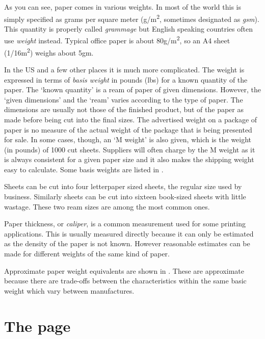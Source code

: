 \documentclass[10pt,letterpaper,extrafontsizes]{memoir}
\newcommand*{\sqrd}[1]{#1\textsuperscript{2}}
\newcommand*{\gsm}{g/\sqrd{m}}
\newcommand*{\half}{\slashfrac{1}{2}}
\begin{document}
    As you can see, paper comes in various weights. In most of the world this
is simply specified as grams per square meter (\gsm, sometimes designated as
\emph{gsm}). This quantity is properly called \emph{grammage}
but English
speaking countries often use \emph{weight} instead. Typical office
paper is about 80\gsm, so an A4 sheet (1/16\sqrd{m}) weighs about 5gm.

    In the US and a few other places it is much more complicated. The
weight is expressed in terms of \emph{basis weight} 
in pounds (lbs) for a known quantity of the
paper. The `known quantity' is a ream of paper of given dimensions. However, 
the `given dimensions' and the `ream' varies according to the type of paper.
The dimensions are usually not those of the finished product, but of the paper
as made before being cut into the final sizes. 
The advertised weight on a package of paper is no measure of the actual 
weight of the package that is being presented for sale. 
In some cases, though, an `M weight' is also given, 
which is the weight (in
pounds) of 1000 cut sheets. Suppliers will often charge by the M weight as it
is always consistent for a given paper size and it also makes the shipping
weight easy to calculate. Some basis weights
are listed in .


    
    Sheets  can be cut into four \abybm{8\,\half}{11}{in}
letterpaper sized sheets, the regular size used by business. 
Similarly sheets  can be cut into sixteen
 book-sized sheets with little wastage. These two ream sizes
are among the most common ones.

    Paper thickness, or \emph{caliper}, is a common measurement
used for some printing applications. This is usually measured directly
because it can only be estimated as the density of the paper is not known.
However reasonable estimates can be made for different weights of
the same kind of paper.

    Approximate paper weight equivalents are shown in .
These are approximate because there are trade-offs between the characteristics
within the same basic weight which vary between manufactures.

   


\chapter{The page}  \label{chap:lpage}
\end{document}
